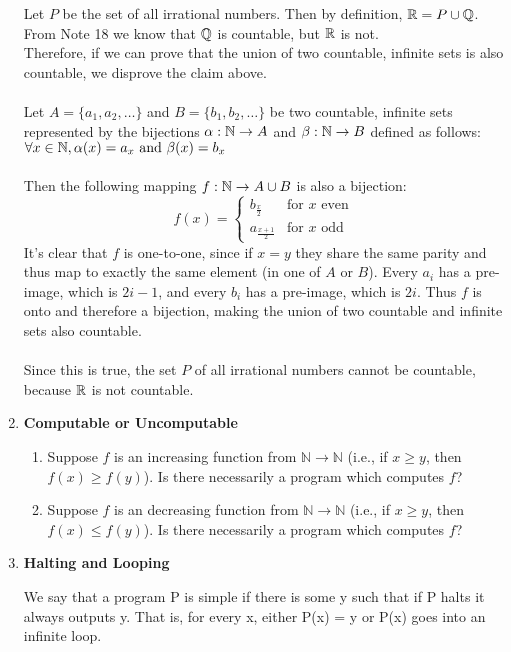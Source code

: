 \documentclass[11pt,fleqn]{article}
\begin{document}
\begin{enumerate}
Let $P$ be the set of all irrational numbers. Then by definition, $\mathbb{R} = P \cup \mathbb{Q}$. \\
From Note 18 we know that $\mathbb{Q}$ is countable, but $\mathbb{R}$ is not. \\
Therefore, if we can prove that the union of two countable, infinite sets is also countable, we disprove the claim above. \\\\
Let $A = \{a_1,a_2,\ldots\}$ and $B = \{b_1,b_2,\ldots\}$ be two countable, infinite sets represented by the bijections $\alpha: \mathbb{N} \rightarrow A$ and $\beta: \mathbb{N} \rightarrow B$ defined as follows: $\forall x \in \mathbb{N}, \alpha(x) = a_x \text{ and } \beta(x) = b_x$ \\\\
Then the following mapping $f: \mathbb{N} \rightarrow A \cup B$ is also a bijection:
\[
 f(x) =
  \begin{cases}
   b_{\frac x2}     & \text{for } x \text{ even} \\
   a_{\frac{x+1}2}  & \text{for } x \text{ odd}
  \end{cases}
\]
It's clear that $f$ is one-to-one, since if $x=y$ they share the same parity and thus map to exactly the same element (in one of $A$ or $B$). Every $a_i$ has a pre-image, which is $2i-1$, and every $b_i$ has a pre-image, which is $2i$. Thus $f$ is onto and therefore a bijection, making the union of two countable and infinite sets also countable. \\\\
Since this is true, the set $P$ of all irrational numbers cannot be countable, because $\mathbb{R}$ is not countable.

\newpage
\item  {\bf Computable or Uncomputable}

\begin{enumerate}
\item Suppose $f$ is an increasing function from $\mathbb{N} \rightarrow \mathbb{N}$ (i.e., if $x \geq y$, then $f(x) \geq f(y)$). Is there necessarily a program which computes $f$?
\item Suppose $f$ is an decreasing function from $\mathbb{N} \rightarrow \mathbb{N}$ (i.e., if $x \geq y$, then $f(x) \leq f(y)$). Is there necessarily a program which computes $f$?
\end{enumerate}

\newpage
\item  {\bf Halting and Looping}

We say that a program P is simple if there is some y such that if P halts it always outputs y. That is, for every x, either P(x) = y or P(x) goes into an infinite loop. 


\end{enumerate}
\end{document}
